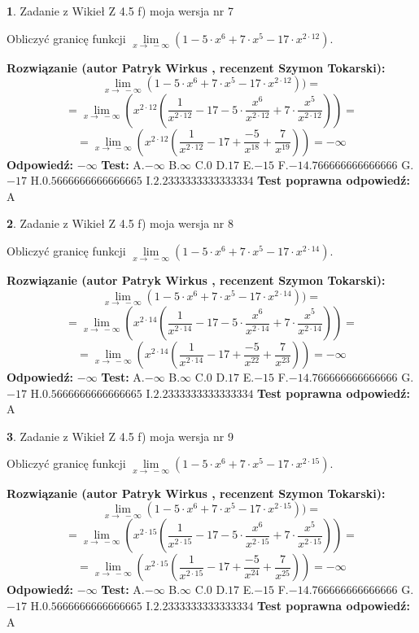 \documentclass[12pt, a4paper]{article}
\theoremstyle{definition} %
\newtheorem{zad}{}
\newcommand{\zadStart}[1]{\begin{zad}#1\newline}
\newcommand{\zadStop}{\end{zad}}
\newcommand{\rozwStart}[2]{\noindent \textbf{Rozwiązanie (autor #1 , recenzent #2): }\newline}
\newcommand{\rozwStop}{\newline}
\newcommand{\odpStart}{\noindent \textbf{Odpowiedź:}\newline}
\newcommand{\odpStop}{\newline}
\newcommand{\testStart}{\noindent \textbf{Test:}\newline}
\newcommand{\testStop}{\newline}
\newcommand{\kluczStart}{\noindent \textbf{Test poprawna odpowiedź:}\newline}
\newcommand{\kluczStop}{\newline}
\begin{document}
\zadStart{Zadanie z Wikieł Z 4.5 f) moja wersja nr 7}


Obliczyć granicę funkcji  $\lim\limits_{x\to\ -\infty}(1 - 5 \cdot x^{6}+7 \cdot x^{5}- 17 \cdot x^{2\cdot12})$.
\zadStop
\rozwStart{Patryk Wirkus}{Szymon Tokarski}
$$\lim\limits_{x\to\ -\infty}(1 - 5 \cdot x^{6}+7 \cdot x^{5}- 17 \cdot x^{2\cdot12}))=$$
$$=\lim\limits_{x\to\ -\infty}(x^{2\cdot12}(\frac{1}{x^{2\cdot12}}-17 -5 \cdot \frac{x^{6}}{x^{2\cdot12}}+7 \cdot \frac{x^{5}}{x^{2\cdot12}}))=$$
$$=\lim\limits_{x\to\ -\infty}(x^{2\cdot12}(\frac{1}{x^{2\cdot12}}-17 + \frac{-5}{x^{18}}+ \frac{7}{x^{19}}))=-\infty$$
\rozwStop
\odpStart
$-\infty$
\odpStop
\testStart
A.$-\infty$ B.$\infty$ C.$0$ D.$17$ E.$-15$
F.$-14.766666666666666$ G.$-17$
H.$0.5666666666666665$
I.$2.2333333333333334$
\testStop
\kluczStart
A
\kluczStop



\zadStart{Zadanie z Wikieł Z 4.5 f) moja wersja nr 8}


Obliczyć granicę funkcji  $\lim\limits_{x\to\ -\infty}(1 - 5 \cdot x^{6}+7 \cdot x^{5}- 17 \cdot x^{2\cdot14})$.
\zadStop
\rozwStart{Patryk Wirkus}{Szymon Tokarski}
$$\lim\limits_{x\to\ -\infty}(1 - 5 \cdot x^{6}+7 \cdot x^{5}- 17 \cdot x^{2\cdot14}))=$$
$$=\lim\limits_{x\to\ -\infty}(x^{2\cdot14}(\frac{1}{x^{2\cdot14}}-17 -5 \cdot \frac{x^{6}}{x^{2\cdot14}}+7 \cdot \frac{x^{5}}{x^{2\cdot14}}))=$$
$$=\lim\limits_{x\to\ -\infty}(x^{2\cdot14}(\frac{1}{x^{2\cdot14}}-17 + \frac{-5}{x^{22}}+ \frac{7}{x^{23}}))=-\infty$$
\rozwStop
\odpStart
$-\infty$
\odpStop
\testStart
A.$-\infty$ B.$\infty$ C.$0$ D.$17$ E.$-15$
F.$-14.766666666666666$ G.$-17$
H.$0.5666666666666665$
I.$2.2333333333333334$
\testStop
\kluczStart
A
\kluczStop



\zadStart{Zadanie z Wikieł Z 4.5 f) moja wersja nr 9}


Obliczyć granicę funkcji  $\lim\limits_{x\to\ -\infty}(1 - 5 \cdot x^{6}+7 \cdot x^{5}- 17 \cdot x^{2\cdot15})$.
\zadStop
\rozwStart{Patryk Wirkus}{Szymon Tokarski}
$$\lim\limits_{x\to\ -\infty}(1 - 5 \cdot x^{6}+7 \cdot x^{5}- 17 \cdot x^{2\cdot15}))=$$
$$=\lim\limits_{x\to\ -\infty}(x^{2\cdot15}(\frac{1}{x^{2\cdot15}}-17 -5 \cdot \frac{x^{6}}{x^{2\cdot15}}+7 \cdot \frac{x^{5}}{x^{2\cdot15}}))=$$
$$=\lim\limits_{x\to\ -\infty}(x^{2\cdot15}(\frac{1}{x^{2\cdot15}}-17 + \frac{-5}{x^{24}}+ \frac{7}{x^{25}}))=-\infty$$
\rozwStop
\odpStart
$-\infty$
\odpStop
\testStart
A.$-\infty$ B.$\infty$ C.$0$ D.$17$ E.$-15$
F.$-14.766666666666666$ G.$-17$
H.$0.5666666666666665$
I.$2.2333333333333334$
\testStop
\kluczStart
A
\kluczStop
\end{document}
